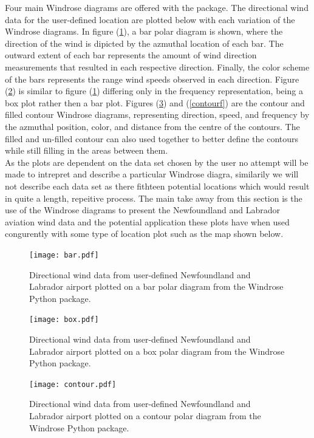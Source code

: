 \documentclass{article}
\begin{document}
\indent Four main Windrose diagrams are offered with the package. The directional wind data for the user-defined location are plotted below with each variation of the Windrose diagrams. In figure 
(\ref{bar}), a bar polar diagram is shown, where the direction of the wind is dipicted by the azmuthal location of each bar. The outward extent of each bar represents the amount of wind direction 
measurements that resulted in each respective direction. Finally, the color scheme of the bars represents the range wind speeds observed in each direction. Figure (\ref{box}) is similar to figure 
(\ref{bar}) differing only in the frequency representation, being a box plot rather then a bar plot. Figures (\ref{contour}) and (\ref{contourf}) are the contour and filled contour Windrose diagrams, 
representing direction, speed, and frequency by the azmuthal position, color, and distance from the centre of the contours. The filled and un-filled contour can also used together to better define the 
contours while still filling in the areas between them.
\\
\indent As the plots are dependent on the data set chosen by the user no attempt will be made to intrepret and describe a particular Windrose diagra, similarily we will not describe each data set as 
there fithteen potential locations which would result in quite a length, repeitive process. The main take away from this section is the use of the Windrose diagrams to present the Newfoundland and 
Labrador aviation wind data and the potential application these plots have when used congurently with some type of location plot such as the map shown below.
   
\begin{figure}[h!]
\centering
\texttt{[image: bar.pdf]}
\caption{Directional wind data from user-defined Newfoundland and Labrador airport plotted on a bar polar diagram from the Windrose Python package.}
\label{bar}
\end{figure}

\begin{figure}[h!]
\centering
\texttt{[image: box.pdf]}
\caption{Directional wind data from user-defined Newfoundland and Labrador airport plotted on a box polar diagram from the Windrose Python package.}
\label{box}
\end{figure}

\begin{figure}[h!]
\centering
\texttt{[image: contour.pdf]}
\caption{Directional wind data from user-defined Newfoundland and Labrador airport plotted on a contour polar diagram from the Windrose Python package.}
\label{contour}
\end{figure}
\end{document}
